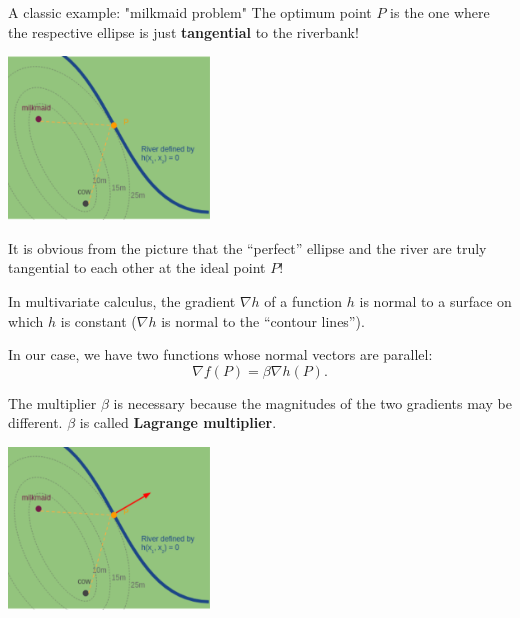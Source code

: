 \begin{vbframe}{A classic example: "milkmaid problem"}
The optimum point $P$ is the one where the respective ellipse is just \textbf{tangential} to the riverbank! 

\begin{center}
	\includegraphics[width = 0.4\textwidth]{figure_man/milkmaid4.png}
\end{center}

It is obvious from the picture that the \enquote{perfect} ellipse and the river are truly tangential to each other at the ideal point $P$! 


\framebreak 

In multivariate calculus, the gradient $\nabla h$ of a function $h$ is normal to a surface on which $h$ is constant ($\nabla h$ is normal to the \enquote{contour lines}). 

\vspace*{0.2cm}

In our case, we have two functions whose normal vectors are parallel: 
$$
	\nabla f(P) = \beta \nabla h(P). 
$$

The multiplier $\beta$ is necessary because the magnitudes of the two gradients may be different. $\beta$ is called \textbf{Lagrange multiplier}. 

\begin{center}
	\includegraphics[width = 0.4\textwidth]{figure_man/milkmaid5.png}
\end{center}

\end{vbframe}

